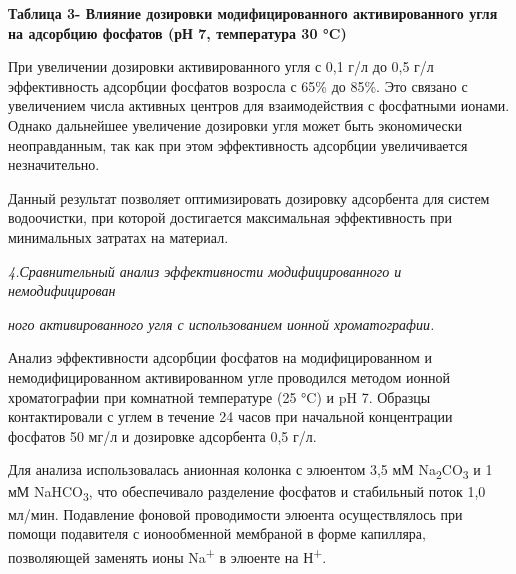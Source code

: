 {\bfseries Таблица 3- Влияние дозировки модифицированного активированного
угля на адсорбцию фосфатов (рН 7, температура 30 °C)}


При увеличении дозировки активированного угля с 0,1 г/л до 0,5 г/л
эффективность адсорбции фосфатов возросла с 65\% до 85\%. Это связано с
увеличением числа активных центров для взаимодействия с фосфатными
ионами. Однако дальнейшее увеличение дозировки угля может быть
экономически неоправданным, так как при этом эффективность адсорбции
увеличивается незначительно.

Данный результат позволяет оптимизировать дозировку адсорбента для
систем водоочистки, при которой достигается максимальная эффективность
при минимальных затратах на материал.

\emph{4.Сравнительный анализ эффективности модифицированного и
немодифицирован}

\emph{ного активированного угля с использованием ионной хроматографии.}

Анализ эффективности адсорбции фосфатов на модифицированном и
немодифицированном активированном угле проводился методом ионной
хроматографии при комнатной температуре (25 °C) и pH 7. Образцы
контактировали с углем в течение 24 часов при начальной концентрации
фосфатов 50 мг/л и дозировке адсорбента 0,5 г/л.

Для анализа использовалась анионная колонка с элюентом 3,5 мМ
Na\textsubscript{2}CO\textsubscript{3} и 1 мМ NaHCO\textsubscript{3},
что обеспечивало разделение фосфатов и стабильный поток 1,0 мл/мин.
Подавление фоновой проводимости элюента осуществлялось при помощи
подавителя с ионообменной мембраной в форме капилляра, позволяющей
заменять ионы Na\textsuperscript{+} в элюенте на Н\textsuperscript{+}.

